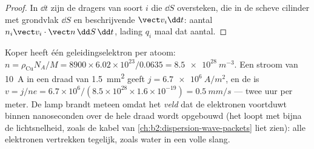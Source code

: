 \begin{proof}
In $\dd t$ zijn de dragers van soort $i$ die $\dd S$ oversteken, die in de
scheve cilinder met grondvlak $\dd S$ en beschrijvende $\vect v_i\dd t$:
aantal $n_i\vect v_i\cdot\vect n\,\dd S\,\dd t$, lading $q_i$ maal dat
aantal.
\end{proof}

\begin{example}\label{ex:b2:charges-currents-conduction:drift}
Koper heeft één geleidingselektron per atoom:
$n = \rho_{\text{Cu}}N_A/M =
8900 \times 6.02 \times 10^{23}/0.0635 = \qty{8.5e28}{m^{-3}}$.
Een stroom van \qty{10}{A} in een draad van \qty{1.5}{mm^2} geeft
$j = \qty{6.7e6}{A/m^2}$, en de \emph{} is
$v = j/ne = 6.7 \times 10^6/(8.5 \times 10^{28} \times 1.6 \times
10^{-19}) = \qty{0.5}{mm/s}$
--- twee uur per meter. De lamp brandt meteen omdat het \emph{veld} dat de
elektronen voortduwt binnen nanoseconden over de hele draad wordt opgebouwd
(het loopt met bijna de lichtsnelheid, zoals de kabel van
\cref{ch:b2:dispersion-wave-packets} liet zien): alle elektronen vertrekken
tegelijk, zoals water in een volle slang.
\end{example}

